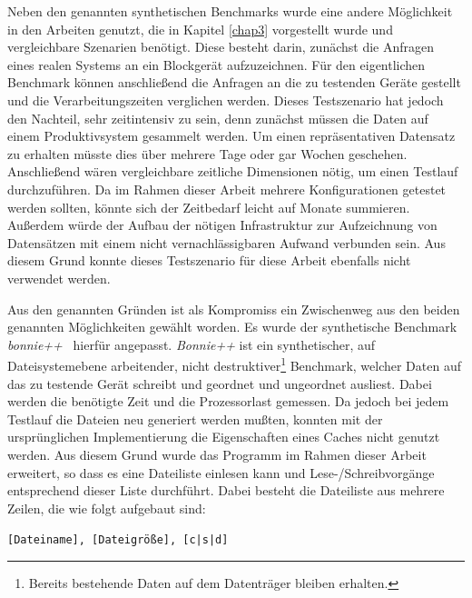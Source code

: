 Neben den genannten synthetischen Benchmarks wurde eine andere Möglichkeit in den Arbeiten genutzt, die in Kapitel \ref{chap3} vorgestellt wurde und
vergleichbare Szenarien benötigt. Diese besteht darin, zunächst die Anfragen eines realen Systems an ein Blockgerät aufzuzeichnen. Für den eigentlichen
Benchmark können anschließend die Anfragen an die zu testenden Geräte gestellt und die Verarbeitungszeiten verglichen werden. Dieses Testszenario hat jedoch den
Nachteil, sehr zeitintensiv zu sein, denn zunächst müssen die Daten auf einem Produktivsystem gesammelt werden. Um einen repräsentativen Datensatz zu erhalten
müsste dies über mehrere Tage oder gar Wochen geschehen. Anschließend wären vergleichbare zeitliche Dimensionen nötig, um einen Testlauf durchzuführen. Da im Rahmen
dieser Arbeit mehrere Konfigurationen getestet werden sollten, könnte sich der Zeitbedarf leicht auf Monate summieren. Außerdem würde der Aufbau der nötigen
Infrastruktur zur Aufzeichnung von Datensätzen mit einem nicht vernachlässigbaren Aufwand verbunden sein. Aus diesem Grund konnte dieses Testszenario für diese
Arbeit ebenfalls nicht verwendet werden.

Aus den genannten Gründen ist als Kompromiss ein Zwischenweg aus den beiden genannten Möglichkeiten gewählt worden. Es wurde der synthetische
Benchmark \textit{\mbox{bonnie++}}~\cite{bonnie} hierfür angepasst. \textit{\mbox{Bonnie++}} ist ein synthetischer, auf Dateisystemebene arbeitender, nicht
destruktiver\footnote{Bereits bestehende Daten auf dem Datenträger bleiben erhalten.} Benchmark, welcher Daten auf das zu testende Gerät schreibt und geordnet
und ungeordnet ausliest. Dabei werden die benötigte Zeit und die Prozessorlast gemessen. Da jedoch bei jedem Testlauf die Dateien neu generiert werden mußten,
konnten mit der ursprünglichen Implementierung die Eigenschaften eines Caches nicht genutzt werden. Aus diesem Grund wurde das Programm im Rahmen dieser Arbeit
erweitert, so dass es eine Dateiliste einlesen kann und Lese-/Schreibvorgänge entsprechend dieser Liste durchführt. Dabei besteht die Dateiliste aus mehrere
Zeilen, die wie folgt aufgebaut sind:

\begin{flushleft}
\hspace{0.25cm} \small \texttt{[Dateiname], [Dateigröße], [c|s|d]}
\end{flushleft}

